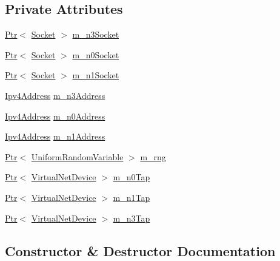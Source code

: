 \subsection*{Private Attributes}
\begin{DoxyCompactItemize}
\item 
\hyperlink{classns3_1_1Ptr}{Ptr}$<$ \hyperlink{classns3_1_1Socket}{Socket} $>$ \hyperlink{classTunnel_a21a5e742ee9f95bb7d32de37722506bc}{m\+\_\+n3\+Socket}
\item 
\hyperlink{classns3_1_1Ptr}{Ptr}$<$ \hyperlink{classns3_1_1Socket}{Socket} $>$ \hyperlink{classTunnel_add805aff2d393a88c0a2b7687bd9672c}{m\+\_\+n0\+Socket}
\item 
\hyperlink{classns3_1_1Ptr}{Ptr}$<$ \hyperlink{classns3_1_1Socket}{Socket} $>$ \hyperlink{classTunnel_a37ed2d6757044f2eb8e3eae0fc50ec08}{m\+\_\+n1\+Socket}
\item 
\hyperlink{classns3_1_1Ipv4Address}{Ipv4\+Address} \hyperlink{classTunnel_a4cc3ccd1fbb9dc1ac7b18e5d0878be9c}{m\+\_\+n3\+Address}
\item 
\hyperlink{classns3_1_1Ipv4Address}{Ipv4\+Address} \hyperlink{classTunnel_a6d6a6d6a249c6dbb468dd62da0bd7650}{m\+\_\+n0\+Address}
\item 
\hyperlink{classns3_1_1Ipv4Address}{Ipv4\+Address} \hyperlink{classTunnel_a41673b211b64a1dc1bfb8cb6e3f5426d}{m\+\_\+n1\+Address}
\item 
\hyperlink{classns3_1_1Ptr}{Ptr}$<$ \hyperlink{classns3_1_1UniformRandomVariable}{Uniform\+Random\+Variable} $>$ \hyperlink{classTunnel_a94fb22a67d997fe13a70328b40f81859}{m\+\_\+rng}
\item 
\hyperlink{classns3_1_1Ptr}{Ptr}$<$ \hyperlink{classns3_1_1VirtualNetDevice}{Virtual\+Net\+Device} $>$ \hyperlink{classTunnel_aabf848dee0794747c623cee44ef35344}{m\+\_\+n0\+Tap}
\item 
\hyperlink{classns3_1_1Ptr}{Ptr}$<$ \hyperlink{classns3_1_1VirtualNetDevice}{Virtual\+Net\+Device} $>$ \hyperlink{classTunnel_aed7e6fa039d5faa71281509d8af01e4a}{m\+\_\+n1\+Tap}
\item 
\hyperlink{classns3_1_1Ptr}{Ptr}$<$ \hyperlink{classns3_1_1VirtualNetDevice}{Virtual\+Net\+Device} $>$ \hyperlink{classTunnel_ab5034300964d871923d73a27d1c1a91c}{m\+\_\+n3\+Tap}
\end{DoxyCompactItemize}


\subsection{Constructor \& Destructor Documentation}
